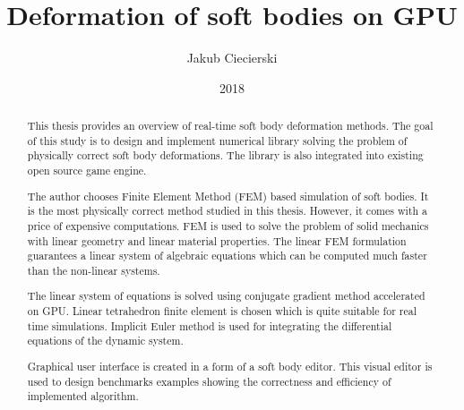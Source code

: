 \documentclass[en]{minipw} %
\title{Deformation of soft bodies on GPU} %
\author{Jakub Ciecierski}
\date{2018}
\begin{document}
\sloppy
\renewcommand{\figurename}{Figure}
\renewcommand{\contentsname}{Table of contents}






\setcounter{page}{1}

\begin{abstract}
This thesis provides an overview of real-time soft body deformation methods. The goal of this study is to design and implement numerical library solving the problem of physically correct soft body deformations. The library is also integrated into existing open source game engine. 

The author chooses Finite Element Method (FEM) based simulation of soft bodies. It is the most physically correct method studied in this thesis. However, it comes with a price of expensive computations. FEM is used to solve the problem of solid mechanics with linear geometry and linear material properties. The linear FEM formulation guarantees a linear system of algebraic equations which can be computed much faster than the non-linear systems.

The linear system of equations is solved using conjugate gradient method accelerated on GPU. Linear tetrahedron finite element is chosen which is quite suitable for real time simulations. Implicit Euler method is used for integrating the differential equations of the dynamic system.

Graphical user interface is created in a form of a soft body editor. This visual editor is used to design benchmarks examples showing the correctness and efficiency of implemented algorithm.

\end{abstract}
\end{document}
